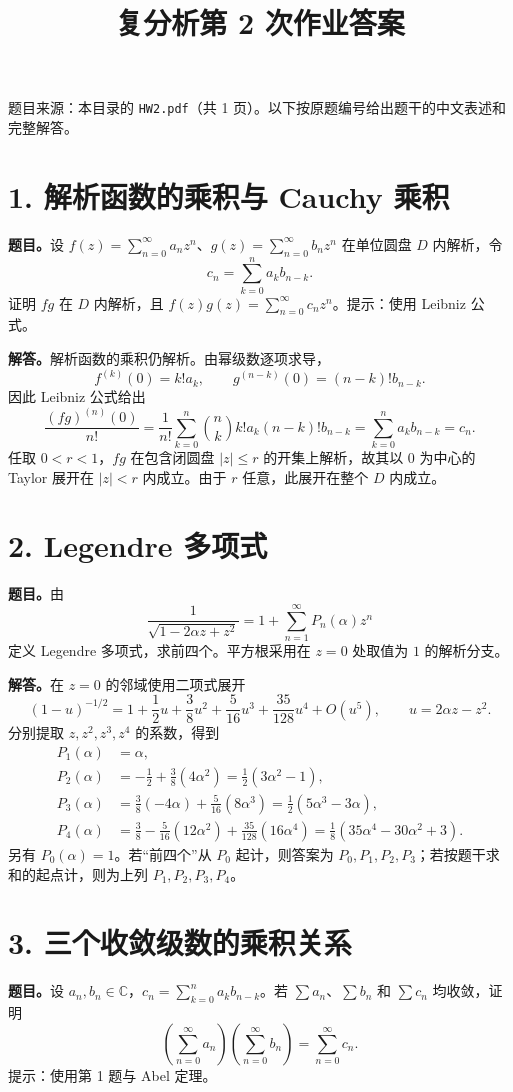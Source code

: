 \documentclass[11pt,a4paper]{ctexart}
\title{复分析第 2 次作业答案}
\author{}\date{}
\begin{document}
\maketitle
\vspace{-2em}
题目来源：本目录的 \texttt{HW2.pdf}（共 1 页）。以下按原题编号给出题干的中文表述和完整解答。

\section*{1. 解析函数的乘积与 Cauchy 乘积}
\textbf{题目。}设 $f(z)=\sum_{n=0}^\infty a_nz^n$、$g(z)=\sum_{n=0}^\infty b_nz^n$ 在单位圆盘 $D$ 内解析，令
\[c_n=\sum_{k=0}^n a_kb_{n-k}.
\]
证明 $fg$ 在 $D$ 内解析，且 $f(z)g(z)=\sum_{n=0}^\infty c_nz^n$。提示：使用 Leibniz 公式。

\textbf{解答。}解析函数的乘积仍解析。由幂级数逐项求导，
\[f^{(k)}(0)=k!a_k,\qquad g^{(n-k)}(0)=(n-k)!b_{n-k}.
\]
因此 Leibniz 公式给出
\[\frac{(fg)^{(n)}(0)}{n!}
=\frac1{n!}\sum_{k=0}^n\binom nk k!a_k(n-k)!b_{n-k}
=\sum_{k=0}^n a_kb_{n-k}=c_n.
\]
任取 $0<r<1$，$fg$ 在包含闭圆盘 $|z|\le r$ 的开集上解析，故其以 $0$ 为中心的 Taylor 展开在 $|z|<r$ 内成立。由于 $r$ 任意，此展开在整个 $D$ 内成立。

\section*{2. Legendre 多项式}
\textbf{题目。}由
\[\frac1{\sqrt{1-2\alpha z+z^2}}=1+\sum_{n=1}^\infty P_n(\alpha)z^n
\]
定义 Legendre 多项式，求前四个。平方根采用在 $z=0$ 处取值为 $1$ 的解析分支。

\textbf{解答。}在 $z=0$ 的邻域使用二项式展开
\[(1-u)^{-1/2}=1+\frac12u+\frac38u^2+\frac5{16}u^3+\frac{35}{128}u^4+O(u^5),
\qquad u=2\alpha z-z^2.
\]
分别提取 $z,z^2,z^3,z^4$ 的系数，得到
\begin{align*}
P_1(\alpha)&=\alpha,\\
P_2(\alpha)&=-\tfrac12+\tfrac38(4\alpha^2)=\tfrac12(3\alpha^2-1),\\
P_3(\alpha)&=\tfrac38(-4\alpha)+\tfrac5{16}(8\alpha^3)
=\tfrac12(5\alpha^3-3\alpha),\\
P_4(\alpha)&=\tfrac38-\tfrac5{16}(12\alpha^2)+\tfrac{35}{128}(16\alpha^4)
=\tfrac18(35\alpha^4-30\alpha^2+3).
\end{align*}
另有 $P_0(\alpha)=1$。若“前四个”从 $P_0$ 起计，则答案为 $P_0,P_1,P_2,P_3$；若按题干求和的起点计，则为上列 $P_1,P_2,P_3,P_4$。

\section*{3. 三个收敛级数的乘积关系}
\textbf{题目。}设 $a_n,b_n\in\mathbb C$，$c_n=\sum_{k=0}^na_kb_{n-k}$。若 $\sum a_n$、$\sum b_n$ 和 $\sum c_n$ 均收敛，证明
\[\left(\sum_{n=0}^\infty a_n\right)\left(\sum_{n=0}^\infty b_n\right)=\sum_{n=0}^\infty c_n.
\]
提示：使用第 1 题与 Abel 定理。
\end{document}
